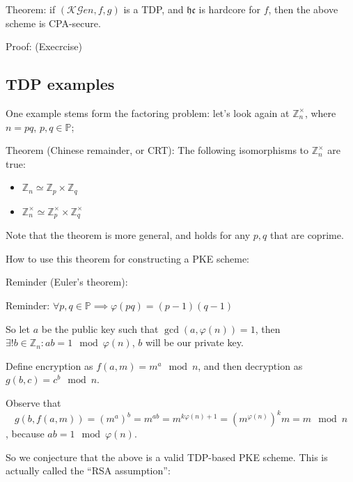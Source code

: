 Theorem: if $(\mathcal{KG}en, f, g)$ is a TDP, and $\mathfrak{hc}$ is hardcore for $f$, then the above scheme is CPA-secure.

Proof: (Execrcise)

\subsection{TDP examples}

One example stems form the factoring problem: let's look again at $\mathbb{Z}_n^\times$, where $n = pq$, $p, q \in \mathbb{P}$;

Theorem (Chinese remainder, or CRT): The following isomorphisms to $\mathbb{Z}_n^\times$ are true:

\begin{itemize}
    \item $\mathbb{Z}_n \simeq \mathbb{Z}_p \times \mathbb{Z}_q$
        \item $\mathbb{Z}_n^\times \simeq \mathbb{Z}_p^\times \times \mathbb{Z}_q^\times$
\end{itemize}

Note that the theorem is more general, and holds for any $p, q$ that are coprime.

How to use this theorem for constructing a PKE scheme:

Reminder (Euler's theorem):

Reminder: $\forall p, q \in \mathbb{P} \implies \varphi(pq) = (p-1)(q-1)$

So let $a$ be the public key such that $\gcd(a, \varphi(n))=1$, then $\exists! b
\in \mathbb{Z}_n : ab = 1 \mod \varphi(n)$, $b$ will be our private key.

Define encryption as $f(a, m) = m^a \mod n$, and then decryption as $g(b, c) =
c^b \mod n$.

Observe that 
\[
g(b, f(a, m)) = (m^a)^b =m^{ab}=m^{k\varphi(n)+1}=(m^{\varphi(n)})^{k}m = m \mod n
\]
, because $ab = 1 \mod \varphi(n)$.

So we conjecture that the above is a valid TDP-based PKE scheme. This is actually called the ``RSA assumption'':

